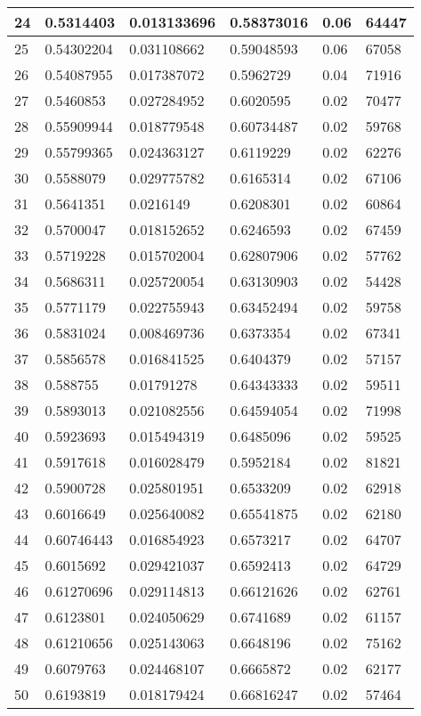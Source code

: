 \begin{longtable}{|l|l|l|l|l|l|}
24 & 0.5314403 & 0.013133696 & 0.58373016 & 0.06 & 64447 \\ \hline 
25 & 0.54302204 & 0.031108662 & 0.59048593 & 0.06 & 67058 \\ \hline 
26 & 0.54087955 & 0.017387072 & 0.5962729 & 0.04 & 71916 \\ \hline 
27 & 0.5460853 & 0.027284952 & 0.6020595 & 0.02 & 70477 \\ \hline 
28 & 0.55909944 & 0.018779548 & 0.60734487 & 0.02 & 59768 \\ \hline 
29 & 0.55799365 & 0.024363127 & 0.6119229 & 0.02 & 62276 \\ \hline 
30 & 0.5588079 & 0.029775782 & 0.6165314 & 0.02 & 67106 \\ \hline 
31 & 0.5641351 & 0.0216149 & 0.6208301 & 0.02 & 60864 \\ \hline 
32 & 0.5700047 & 0.018152652 & 0.6246593 & 0.02 & 67459 \\ \hline 
33 & 0.5719228 & 0.015702004 & 0.62807906 & 0.02 & 57762 \\ \hline 
34 & 0.5686311 & 0.025720054 & 0.63130903 & 0.02 & 54428 \\ \hline 
35 & 0.5771179 & 0.022755943 & 0.63452494 & 0.02 & 59758 \\ \hline 
36 & 0.5831024 & 0.008469736 & 0.6373354 & 0.02 & 67341 \\ \hline 
37 & 0.5856578 & 0.016841525 & 0.6404379 & 0.02 & 57157 \\ \hline 
38 & 0.588755 & 0.01791278 & 0.64343333 & 0.02 & 59511 \\ \hline 
39 & 0.5893013 & 0.021082556 & 0.64594054 & 0.02 & 71998 \\ \hline 
40 & 0.5923693 & 0.015494319 & 0.6485096 & 0.02 & 59525 \\ \hline 
41 & 0.5917618 & 0.016028479 & 0.5952184 & 0.02 & 81821 \\ \hline 
42 & 0.5900728 & 0.025801951 & 0.6533209 & 0.02 & 62918 \\ \hline 
43 & 0.6016649 & 0.025640082 & 0.65541875 & 0.02 & 62180 \\ \hline 
44 & 0.60746443 & 0.016854923 & 0.6573217 & 0.02 & 64707 \\ \hline 
45 & 0.6015692 & 0.029421037 & 0.6592413 & 0.02 & 64729 \\ \hline 
46 & 0.61270696 & 0.029114813 & 0.66121626 & 0.02 & 62761 \\ \hline 
47 & 0.6123801 & 0.024050629 & 0.6741689 & 0.02 & 61157 \\ \hline 
48 & 0.61210656 & 0.025143063 & 0.6648196 & 0.02 & 75162 \\ \hline 
49 & 0.6079763 & 0.024468107 & 0.6665872 & 0.02 & 62177 \\ \hline 
50 & 0.6193819 & 0.018179424 & 0.66816247 & 0.02 & 57464 \\ \hline 
\end{longtable}